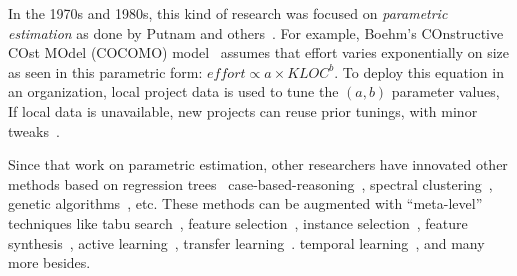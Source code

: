 \documentclass{sig-alternate}
\begin{document}
In the 1970s and 1980s, this kind of research was focused on
{\em parametric estimation} as done 
by Putnam and
others~\cite{wol74,frei79,black77,herd77,watson77,boehm81}. For example, Boehm's
COnstructive COst MOdel (COCOMO)
model~\cite{boehm81} 
 assumes  that effort varies exponentially on size as seen in this parametric form:
$\mathit{effort} \propto \mathit{a \times KLOC}^b$. To deploy this equation in an organization,
local project data is used to tune the  $(a,b)$ parameter values, If local
data is unavailable, new projects can reuse prior tunings,  with  minor
tweaks~\cite{me04h}. 

 

  


Since that    work on parametric estimation, other researchers
have innovated other  methods based on
regression
trees~\cite{shepperd97}
case-based-reasoning~\cite{shepperd97}, spectral
clustering~\cite{me12d}, genetic
algorithms~\cite{cordero97,burgess01}, etc.  These methods
can be augmented with  ``meta-level'' techniques like tabu search~\cite{cora10}, feature selection~\cite{chen05}, instance selection~\cite{koc11b},
feature synthesis~\cite{me12a}, active learning~\cite{me13a}, transfer learning~\cite{kocaguneli2014transfer}.
temporal learning~\cite{lokan09,minku14}, and many more besides.


\end{document}
